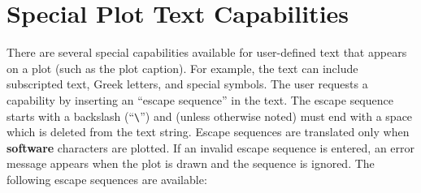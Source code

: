 \chapter{Special Plot Text Capabilities} \label{appx:plt}

There are several special capabilities available for user-defined text
that appears on a plot (such as the plot caption). For example, the text
can include subscripted text, Greek letters, and special symbols. The
user requests a capability by inserting an ``escape sequence'' in the
text. The escape sequence starts with a backslash (``\verb|\|'') and
(unless otherwise noted) must end with a space which is
deleted from the text string. Escape sequences are translated only when
{\bf software} characters are plotted. If an invalid escape sequence is
entered, an error message appears when the plot is drawn and the
sequence is ignored.
The following escape sequences are available:

